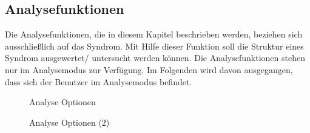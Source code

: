 \documentclass[enabledeprecatedfontcommands,fontsize=11pt,paper=a4,twoside]{scrartcl}
\newcounter{one}
\begin{document}
\subsection{Analysefunktionen} \label{analyse}
Die Analysefunktionen, die in diesem Kapitel beschrieben werden, beziehen sich ausschließlich auf das Syndrom. Mit Hilfe dieser Funktion soll die Struktur eines Syndrom ausgewertet/ untersucht werden können. Die Analysefunktionen stehen nur im Analysemodus zur Verfügung. Im Folgenden wird davon ausgegangen, dass sich der Benutzer im Analysemodus befindet.

\begin{figure}[ht!]
	\centering
	\caption{Analyse Optionen}
\end{figure}

\begin{figure}[ht!]
	\centering
	\caption{Analyse Optionen (2)}
\end{figure}
\end{document}
